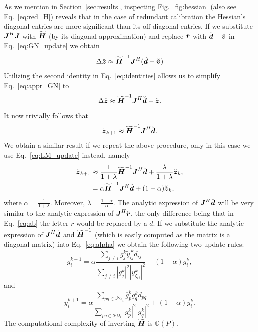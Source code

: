 \documentclass[useAMS,usenatbib]{mn2e}
\newcommand{\bz}{\bmath{z}}
\newcommand{\br}{\bmath{r}}
\newcommand{\bd}{\bmath{d}}
\newcommand{\bv}{\bmath{v}}
\newcommand{\bJ}{\bmath{J}}
\newcommand{\bH}{\bmath{H}}
\newcommand{\conj}[1]{\overline{#1}}
\begin{document}
As we mention in Section~\ref{sec:results}, inspecting Fig.~\ref{fig:hessian} (also see Eq.~\eqref{eq:red_H}) reveals that in the case of redundant calibration the Hessian's diagonal entries are more significant than its off-diagonal entries.
If we substitute $\bJ^H\bJ$ with $\widetilde{\bH}$ (by its diagonal approximation) and replace $\breve{\br}$ with $\breve{\bd} - \breve{\bv}$ in Eq.~\eqref{eq:GN_update} we obtain
\begin{equation}
\label{eq:appr_GN}
 \Delta \breve{\bz} \approx \widetilde{\bH}^{-1}\bJ^H(\breve{\bd}-\breve{\bv})
\end{equation}
Utilizing the second identity in Eq.~\eqref{eq:identities} allows us to simplify Eq.~\eqref{eq:appr_GN} to
\begin{equation}
  \Delta \breve{\bz} \approx \widetilde{\bH}^{-1}\bJ^H\breve{\bd}-\breve{\bz}.
\end{equation}
It now trivially follows that
\begin{equation}
 \breve{\bz}_{k+1} \approx \widetilde{\bH}^{-1}\bJ^H\breve{\bd}.
\end{equation}
We obtain a similar result if we repeat the above procedure, only in this case we use Eq.~\eqref{eq:LM_update} instead,
namely
\begin{align}
\breve{\bz}_{k+1} &\approx \frac{1}{1+\lambda}\widetilde{\bH}^{-1}\bJ^H\breve{\bd} + \frac{\lambda}{1+\lambda} \breve{\bz}_k,\label{eq:lambda}\\
 &= \alpha \widetilde{\bH}^{-1}\bJ^H\breve{\bd} + (1-\alpha)\breve{\bz}_k, \label{eq:alpha}  
\end{align}
where $\alpha = \frac{1}{1+\lambda}$. Moreover, $\lambda = \frac{1-\alpha}{\alpha}$.
The analytic expression of $\bJ^H\breve{\bd}$ will be very similar to the analytic 
expression of $\bJ^H\breve{\br}$, the only difference being that in Eq.~\eqref{eq:ab} the letter $r$ would be replaced by a $d$. If we substitute the analytic expression
of $\bJ^H\breve{\bd}$ and $\widetilde{\bH}^{-1}$ (which is easily computed as the matrix is a diagonal matrix) into Eq.~\eqref{eq:alpha} we obtain the following two update rules:
\begin{equation}
\label{eq:g_update}
g_{i}^{k+1} = \alpha \frac{\sum_{j\neq i} g_j^k \widetilde{y}_{ij}^{~\!\!k} d_{ij}}{\sum_{j\neq i} |g_j^k|^2|y_{\zeta_{ij}}^k|^2} + (1-\alpha) g_i^k, 
\end{equation}
and
\begin{equation}
\label{eq:y_update}
y_{i}^{k+1} = \alpha \frac{\sum_{pq \in \mathcal{PQ}_i} \conj{g}_p^k g_q^k d_{pq}}{\sum_{pq \in \mathcal{PQ}_i}|g_p^k|^2|g_q^k|^2} + (1-\alpha) y_i^k. 
\end{equation}
The computational complexity of inverting $\widetilde{\bH}$ is $\mathbb{O}(P)$.
\end{document}
